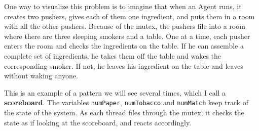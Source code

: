 One way to visualize this problem is to imagine that when an
Agent runs, it creates two pushers, gives each of them one ingredient,
and puts them in a room with all the other pushers.  Because of the
mutex, the pushers file into a room where there are
three sleeping smokers and a table.  One at a time, each pusher enters
the room and checks the ingredients on the table.  If he can
assemble a complete set of ingredients, he takes them off the table
and wakes the corresponding smoker.  If not, he leaves his ingredient
on the table and leaves without waking anyone.

This is an example of a pattern we will see several times, which
I call a {\bf scoreboard}.  The variables {\tt numPaper}, {\tt numTobacco}
and {\tt numMatch} keep track of the state of the system.  As each
thread files through the mutex, it checks the state as if looking
at the scoreboard, and reacts accordingly.

